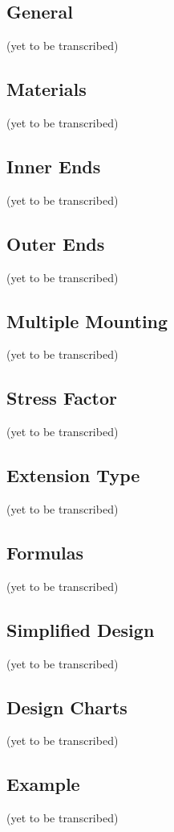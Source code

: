 \documentclass[10pt]{article}
\begin{document}
\subsection{General}
(yet to be transcribed)
\subsection{Materials}
(yet to be transcribed)
\subsection{Inner Ends}
(yet to be transcribed)

\subsection{Outer Ends}
(yet to be transcribed)

\subsection{Multiple Mounting}
(yet to be transcribed)

\subsection{Stress Factor}
(yet to be transcribed)

\subsection{Extension Type}
(yet to be transcribed)

\subsection{Formulas}
(yet to be transcribed)

\subsection{Simplified Design}
(yet to be transcribed)

\subsection{Design Charts}
(yet to be transcribed)

\subsection{Example}
(yet to be transcribed)
\end{document}
